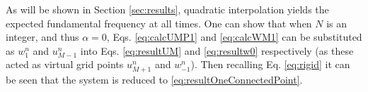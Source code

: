 As will be shown in Section \ref{sec:results}, quadratic interpolation yields the expected fundamental frequency at all times. One can show that when $N$ is an integer, and thus $\alpha = 0$, Eqs. \eqref{eq:calcUMP1} and \eqref{eq:calcWM1} can be substituted as $w_1^n$ and $u_{M-1}^n$ into Eqs. \eqref{eq:resultUM} and \eqref{eq:resultw0} respectively (as these acted as virtual grid points $u_{M+1}^n$ and $w_{-1}^n$). Then recalling Eq. \eqref{eq:rigid} it can be seen that the system is reduced to \eqref{eq:resultOneConnectedPoint}. %

